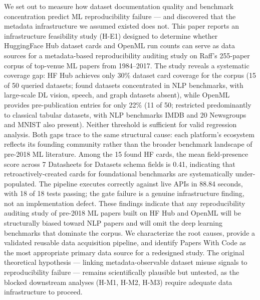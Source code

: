 
We set out to measure how dataset documentation quality and benchmark concentration predict ML reproducibility failure --- and discovered that the metadata infrastructure we assumed existed does not. This paper reports an infrastructure feasibility study (H-E1) designed to determine whether HuggingFace Hub dataset cards and OpenML run counts can serve as data sources for a metadata-based reproducibility auditing study on Raff's 255-paper corpus of top-venue ML papers from 1984--2017. The study reveals a systematic coverage gap: HF Hub achieves only 30\% dataset card coverage for the corpus (15 of 50 queried datasets; found datasets concentrated in NLP benchmarks, with large-scale DL vision, speech, and graph datasets absent), while OpenML provides pre-publication entries for only 22\% (11 of 50; restricted predominantly to classical tabular datasets, with NLP benchmarks IMDB and 20 Newsgroups and MNIST also present). Neither threshold is sufficient for valid regression analysis. Both gaps trace to the same structural cause: each platform's ecosystem reflects its founding community rather than the broader benchmark landscape of pre-2018 ML literature. Among the 15 found HF cards, the mean field-presence score across 7 Datasheets for Datasets schema fields is 0.41, indicating that retroactively-created cards for foundational benchmarks are systematically under-populated. The pipeline executes correctly against live APIs in 88.84 seconds, with 18 of 18 tests passing; the gate failure is a genuine infrastructure finding, not an implementation defect. These findings indicate that any reproducibility auditing study of pre-2018 ML papers built on HF Hub and OpenML will be structurally biased toward NLP papers and will omit the deep learning benchmarks that dominate the corpus. We characterize the root causes, provide a validated reusable data acquisition pipeline, and identify Papers With Code as the most appropriate primary data source for a redesigned study. The original theoretical hypothesis --- linking metadata-observable dataset misuse signals to reproducibility failure --- remains scientifically plausible but untested, as the blocked downstream analyses (H-M1, H-M2, H-M3) require adequate data infrastructure to proceed.

